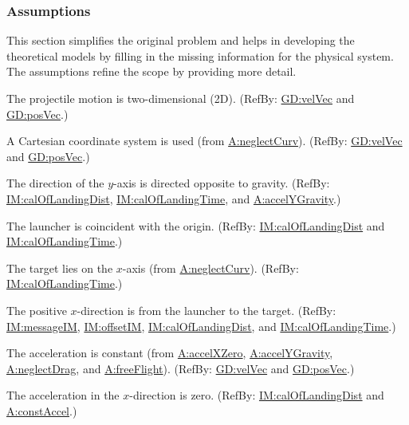 \documentclass[12pt]{article}
\begin{document}
\subsubsection{Assumptions}
\label{Sec:Assumps}
This section simplifies the original problem and helps in developing the theoretical models by filling in the missing information for the physical system. The assumptions refine the scope by providing more detail.

\begin{description}[font=\normalfont]
\item[twoDMotion:\phantomsection\label{twoDMotion}]{The projectile motion is two-dimensional (2D). (RefBy: \hyperref[GD:velVec]{GD:velVec} and \hyperref[GD:posVec]{GD:posVec}.)}
\item[cartSyst:\phantomsection\label{cartSyst}]{A Cartesian coordinate system is used (from \hyperref[neglectCurv]{A:neglectCurv}). (RefBy: \hyperref[GD:velVec]{GD:velVec} and \hyperref[GD:posVec]{GD:posVec}.)}
\item[yAxisGravity:\phantomsection\label{yAxisGravity}]{The direction of the $y$-axis is directed opposite to gravity. (RefBy: \hyperref[IM:calOfLandingDist]{IM:calOfLandingDist}, \hyperref[IM:calOfLandingTime]{IM:calOfLandingTime}, and \hyperref[accelYGravity]{A:accelYGravity}.)}
\item[launchOrigin:\phantomsection\label{launchOrigin}]{The launcher is coincident with the origin. (RefBy: \hyperref[IM:calOfLandingDist]{IM:calOfLandingDist} and \hyperref[IM:calOfLandingTime]{IM:calOfLandingTime}.)}
\item[targetXAxis:\phantomsection\label{targetXAxis}]{The target lies on the $x$-axis (from \hyperref[neglectCurv]{A:neglectCurv}). (RefBy: \hyperref[IM:calOfLandingTime]{IM:calOfLandingTime}.)}
\item[posXDirection:\phantomsection\label{posXDirection}]{The positive $x$-direction is from the launcher to the target. (RefBy: \hyperref[IM:messageIM]{IM:messageIM}, \hyperref[IM:offsetIM]{IM:offsetIM}, \hyperref[IM:calOfLandingDist]{IM:calOfLandingDist}, and \hyperref[IM:calOfLandingTime]{IM:calOfLandingTime}.)}
\item[constAccel:\phantomsection\label{constAccel}]{The acceleration is constant (from \hyperref[accelXZero]{A:accelXZero}, \hyperref[accelYGravity]{A:accelYGravity}, \hyperref[neglectDrag]{A:neglectDrag}, and \hyperref[freeFlight]{A:freeFlight}). (RefBy: \hyperref[GD:velVec]{GD:velVec} and \hyperref[GD:posVec]{GD:posVec}.)}
\item[accelXZero:\phantomsection\label{accelXZero}]{The acceleration in the $x$-direction is zero. (RefBy: \hyperref[IM:calOfLandingDist]{IM:calOfLandingDist} and \hyperref[constAccel]{A:constAccel}.)}

\end{description}
\end{document}
